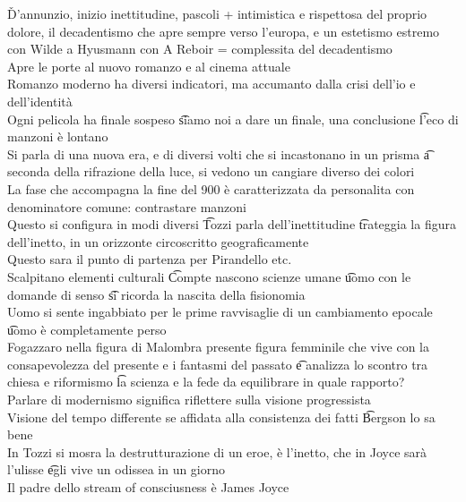 \documentclass[12pt]{article}
\begin{document}
\v

D'annunzio, inizio inettitudine, pascoli + intimistica e rispettosa del proprio dolore, il decadentismo che apre sempre verso l'europa, e un estetismo estremo con Wilde a Hyusmann con A Reboir = complessita del decadentismo \\
Apre le porte al nuovo romanzo e al cinema attuale \\
Romanzo moderno ha diversi indicatori, ma accumanto dalla crisi dell'io e dell'identità \\
Ogni pelicola ha finale sospeso \t siamo noi a dare un finale, una conclusione \t l'eco di manzoni è lontano \\
Si parla di una nuova era, e di diversi volti che si incastonano in un prisma \t a seconda della rifrazione della luce, si vedono un cangiare diverso dei colori \\
La fase che accompagna la fine del 900 è caratterizzata da personalita con denominatore comune: contrastare manzoni \\
Questo si configura in modi diversi \t Tozzi parla dell'inettitudine \t trateggia la figura dell'inetto, in un orizzonte circoscritto geograficamente \\
Questo sara il punto di partenza per Pirandello etc. \\
Scalpitano elementi culturali \t Compte nascono scienze umane \t uomo con le domande di senso \t si ricorda la nascita della fisionomia \t \\
Uomo si sente ingabbiato per le prime ravvisaglie di un cambiamento epocale \t uomo è completamente perso \\
Fogazzaro nella figura di Malombra presente figura femminile che vive con la consapevolezza del presente e i fantasmi del passato \t e analizza lo scontro tra chiesa e riformismo \t la scienza e la fede da equilibrare in quale rapporto? \\
Parlare di modernismo significa riflettere sulla visione progressista \\
Visione del tempo differente se affidata alla consistenza dei fatti \t Bergson lo sa bene \\
In Tozzi si mosra la destrutturazione di un eroe, è l'inetto, che in Joyce sarà l'ulisse \t egli vive un odissea in un giorno \\
Il padre dello stream of consciusness è James Joyce
\end{document}
